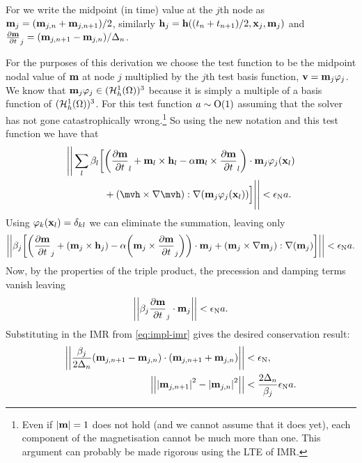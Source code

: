 {For  we write the midpoint (in time) value at the $j$th node as $\boldsymbol{\mathrm{m}}_j = (\boldsymbol{\mathrm{m}}_{j,n} + \boldsymbol{\mathrm{m}}_{j,n+1})/2$,  similarly $\boldsymbol{\mathrm{h}}_j = \boldsymbol{\mathrm{h}}((t_n+t_{n+1})/2, \boldsymbol{\mathrm{x}}_j, \boldsymbol{\mathrm{m}}_j)$ and $\frac{\partial \boldsymbol{\mathrm{m}}}{\partial t}_j = (\boldsymbol{\mathrm{m}}_{j,n+1} - \boldsymbol{\mathrm{m}}_{j,n})/\Delta_{n}$.

For the purposes of this derivation we choose the test function to be the midpoint nodal value of $\boldsymbol{\mathrm{m}}$ at node $j$ multiplied by the $j$th test basis function, \ie $\boldsymbol{\mathrm{v}} = \boldsymbol{\mathrm{m}}_{j} \varphi_j$.
We know that $\boldsymbol{\mathrm{m}}_{j}\varphi_j \in  ({\mathcal{H}^1_h(\Omega)})^3$ because it is simply a multiple of a basis function of $({\mathcal{H}^1_h(\Omega)})^3$.
For this test function $a \sim \mathrm{O}{\left( 1 \right)}$ assuming that the solver has not gone catastrophically wrong.\footnote{Even if $\left|{\boldsymbol{\mathrm{m}}} \right|=1$ does not hold (and we cannot assume that it does yet), each component of the magnetisation cannot be much more than one. This argument can probably be made rigorous using the LTE of IMR.}
So using the new notation and this test function we have that
\begin{equation}
  \begin{aligned}
    \Bigg|\Bigg| \sum_l \beta_l \bigg[& \bigb{\dmdt_l + \mv_{l} \times \hv_l - \dampc \mv_{l} \times \dmdt_l} \cdot \mv_{j}\tbf_j(\xv_l) \\
    &+ \bigb{\mvh \times \grad \mvh} : \grad (\mv_{j}\tbf_j(\xv_l)) \Big] \Bigg|\Bigg| < \ntol \sumbasiscoeff.
  \end{aligned}
\end{equation}
Using $\varphi_k(\boldsymbol{\mathrm{x}}_l) = \delta_{kl}$ we can eliminate the summation, leaving only
\begin{equation}
  \begin{aligned}
    \left| \left| \beta_j \bigg[ {\left( \frac{\partial \boldsymbol{\mathrm{m}}}{\partial t}_j  + (\boldsymbol{\mathrm{m}}_{j} \times \boldsymbol{\mathrm{h}}_{j})  - \alpha {\left( \boldsymbol{\mathrm{m}}_{j} \times \frac{\partial \boldsymbol{\mathrm{m}}}{\partial t}_j \right)} \right)} \cdot \boldsymbol{\mathrm{m}}_{j}
    + {\left( \boldsymbol{\mathrm{m}}_j \times \nabla \boldsymbol{\mathrm{m}}_j \right)} : \nabla (\boldsymbol{\mathrm{m}}_{j})
    \bigg]  \right| \right| < \epsilon_{\mathrm{N}} a.
  \end{aligned}
\end{equation}
Now, by the properties of the triple product, the precession and damping terms vanish leaving
\begin{equation}
  \left| \left| \beta_j \frac{\partial \boldsymbol{\mathrm{m}}}{\partial t}_j \cdot  \boldsymbol{\mathrm{m}}_{j}  \right| \right| < \epsilon_{\mathrm{N}} a.
\end{equation}
Substituting in the IMR from \cref{eq:impl-imr} gives the desired conservation result:
\begin{equation}
  \begin{aligned}
    \left| \left| \frac{\beta_j}{2\Delta_{n}}(\boldsymbol{\mathrm{m}}_{j,n+1} - \boldsymbol{\mathrm{m}}_{j,n}) \cdot (\boldsymbol{\mathrm{m}}_{j, n+1} + \boldsymbol{\mathrm{m}}_{j, n}) \right| \right| &< \epsilon_{\mathrm{N}}, \\
    \left| \left| \left|{\boldsymbol{\mathrm{m}}_{j, n+1}} \right|^2 - \left|{\boldsymbol{\mathrm{m}}_{j, n}} \right|^2 \right| \right| &< \frac{2\Delta_{n}}{\beta_j} \epsilon_{\mathrm{N}} a.
  \end{aligned}
\end{equation}

}
